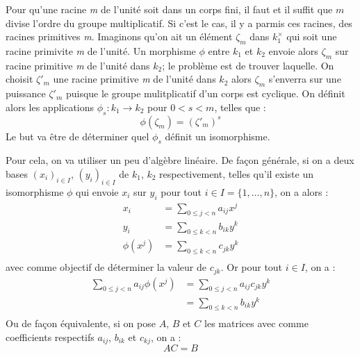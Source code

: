 \documentclass[a4paper]{article} %
\numberwithin{section}{part}
\numberwithin{equation}{section}
\newcommand\nroot[1]{\textit{#1}\up{\textit{ième}}}
\begin{document}
Pour qu'une racine \nroot{m} de l'unité soit dans un corps fini, il faut et il 
suffit que $m$ divise l'ordre du groupe multiplicatif. Si c'est le cas, il y a
parmis ces racines, des racines primitives \nroot{m}. Imaginons qu'on ait un 
élément $\zeta_m$ dans $k_1^{\times}$ qui soit une racine primivite \nroot{m} de
l'unité. Un morphisme $\phi$ entre $k_1$ et $k_2$ envoie alors 
$\zeta_m$ sur racine primitive \nroot{m} de l'unité dans $k_2$; le problème est
de trouver laquelle. On choisit $\zeta'_m$ une racine primitive \nroot{m} de 
l'unité dans $k_2$ alors $\zeta_m$ s'enverra sur une puissance $\zeta'_m$
puisque le groupe mulitplicatif d'un corps est cyclique. On définit alors les 
applications $\phi_s : k_1 \to k_2$ pour $0 < s < m$, telles que :
\[\phi(\zeta_m) = (\zeta'_m)^s\]
Le but va être de déterminer quel $\phi_s$ définit un isomorphisme.\par
Pour cela, on va utiliser un peu d'algèbre linéaire. De façon générale, si on a
deux bases $(x_i)_{i\in I}$, $(y_i)_{i\in I}$ de $k_1$, $k_2$ respectivement,
telles qu'il existe un isomorphisme $\phi$ qui envoie $x_i$ sur $y_i$ pour tout
$i\in I = \lbrace{1,\dots,n}\rbrace$, on a alors :
\begin{align*}
x_i &= \sum_{0\leq j < n}{a_{ij}x^j}\\
y_i &= \sum_{0\leq k < n}{b_{ik}y^k}\\
\phi(x^j) &= \sum_{0\leq k < n}{c_{jk}y^k}\\
\end{align*}
avec comme objectif de déterminer la valeur de $c_{jk}$. Or pour tout $i\in I$, 
on a : 
\begin{align*}
\sum_{0\leq j < n}{a_{ij}\phi{(x^j)}}&= \sum_{0\leq j < n}{a_{ij}c_{jk}y^k}\\
&= \sum_{0\leq k < n}{b_{ik}y^k}\\
\end{align*}
Ou de façon équivalente, si on pose $A$, $B$ et $C$ les matrices avec comme 
coefficients respectifs $a_{ij}$, $b_{ik}$ et $c_{kj}$, on a :
\[AC = B\]\par
\end{document}
